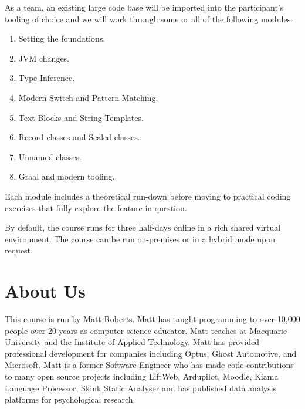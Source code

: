 \documentclass[twoside=false,DIV=14]{scrartcl}
\begin{document}
As a team, an existing large code base will be imported into the participant's tooling of choice and we will work through some or all of the following modules:
\begin{enumerate}
    \item Setting the foundations.
    \item JVM changes.
    \item Type Inference.
    \item Modern Switch and Pattern Matching.
    \item Text Blocks and String Templates.
    \item Record classes and Sealed classes.
    \item Unnamed classes.
    \item Graal and modern tooling.
\end{enumerate}
Each module includes a theoretical run-down before moving to practical coding exercises that fully explore the feature in question.

By default, the course runs for three half-days online in a rich shared virtual environment.  The course can be run on-premises or in a hybrid mode upon request.

\section{About Us}
This course is run by Matt Roberts.  Matt has taught programming to over 10,000 people over 20 years as computer science educator.  Matt teaches at Macquarie University and the Institute of Applied Technology.  Matt has provided professional development for companies including Optus, Ghost Automotive, and Microsoft.  Matt is a former Software Engineer who has made code contributions to many open source projects including LiftWeb, Ardupilot, Moodle, Kiama Language Processor, Skink Static Analyser and has published data analysis platforms for psychological research.
\end{document}
